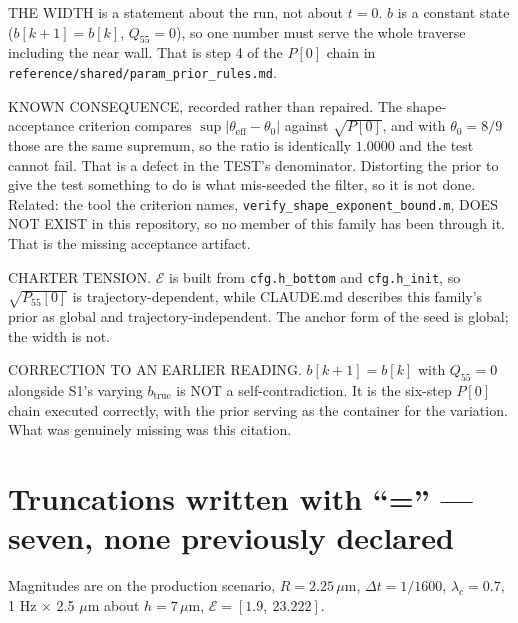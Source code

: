 \documentclass[11pt,a4paper,fontset=none]{ctexart}
\begin{document}
THE WIDTH is a statement about the run, not about $t=0$. $b$ is a constant state
($b[k+1] = b[k]$, $Q_{55} = 0$), so one number must serve the whole traverse
including the near wall. That is step 4 of the $P[0]$ chain in
\texttt{reference/shared/param\_prior\_rules.md}.

KNOWN CONSEQUENCE, recorded rather than repaired. The shape-acceptance criterion
compares $\sup|\theta_{\mathrm{eff}} - \theta_0|$ against $\sqrt{P[0]}$, and with
$\theta_0 = 8/9$ those are the same supremum, so the ratio is identically
$1.0000$ and the test cannot fail. That is a defect in the TEST's denominator.
Distorting the prior to give the test something to do is what mis-seeded the
filter, so it is not done. Related: the tool the criterion names,
\texttt{verify\_shape\_exponent\_bound.m}, DOES NOT EXIST in this repository, so
no member of this family has been through it. That is the missing acceptance
artifact.

CHARTER TENSION. $\mathcal{E}$ is built from \texttt{cfg.h\_bottom} and
\texttt{cfg.h\_init}, so $\sqrt{P_{55}[0]}$ is trajectory-dependent, while
CLAUDE.md describes this family's prior as global and trajectory-independent.
The anchor form of the seed is global; the width is not.

CORRECTION TO AN EARLIER READING. $b[k+1] = b[k]$ with $Q_{55} = 0$ alongside
S1's varying $b_{\mathrm{true}}$ is NOT a self-contradiction. It is the six-step
$P[0]$ chain executed correctly, with the prior serving as the container for the
variation. What was genuinely missing was this citation.

\section*{Truncations written with ``='' --- seven, none previously declared}

Magnitudes are on the production scenario, $R = 2.25\,\mu$m, $\Delta t = 1/1600$,
$\lambda_c = 0.7$, 1 Hz $\times$ 2.5 $\mu$m about $h = 7\,\mu$m,
$\mathcal{E} = [1.9,\ 23.222]$.
\end{document}
